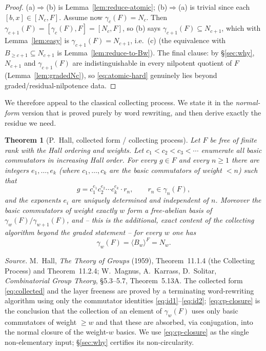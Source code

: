 \documentclass{amsart}
\newtheorem{theorem}{Theorem}
\theoremstyle{definition}
\theoremstyle{remark}
\begin{document}
\begin{proof}
(a)$\Rightarrow$(b) is Lemma~\ref{lem:reduce-atomic}; (b)$\Rightarrow$(a) is
trivial since each $[b,x]\in[N_c,F]$. Assume now $\gamma_c(F)=N_c$. Then
$\gamma_{c+1}(F)=[\gamma_c(F),F]=[N_c,F]$, so (b) says
$\gamma_{c+1}(F)\subseteq N_{c+1}$, which with Lemma~\ref{lem:easy} is
$\gamma_{c+1}(F)=N_{c+1}$, i.e.\ (c) (the equivalence with $B_{\ge c+1}\subseteq
N_{c+1}$ is Lemma~\ref{lem:reduce-to-Bw}). The final clause: by
\S\ref{sec:why}, $N_{c+1}$ and $\gamma_{c+1}(F)$ are indistinguishable in every
nilpotent quotient of $F$ (Lemma~\ref{lem:gradedNc}), so \eqref{eq:atomic-hard}
genuinely lies beyond graded/residual-nilpotence data.
\end{proof}

We therefore appeal to the classical collecting process. We state it in the
\emph{normal-form} version that is proved purely by word rewriting, and then derive
exactly the residue we need.

\begin{theorem}[P.~Hall, collected form / collecting process]\label{thm:cp}
Let $F$ be free of finite rank with the Hall ordering and weights. Let
$c_1<c_2<c_3<\cdots$ enumerate \emph{all} basic commutators in increasing Hall
order. For every $g\in F$ and every $n\ge1$ there are integers $e_1,\dots,e_{k}$
(where $c_1,\dots,c_k$ are the basic commutators of weight $<n$) such that
\begin{equation}\label{eq:collected}
g=c_1^{e_1}c_2^{e_2}\cdots c_k^{e_k}\cdot r_n,\qquad r_n\in\gamma_n(F),
\end{equation}
and the exponents $e_i$ are uniquely determined and independent of $n$. Moreover
the basic commutators of weight exactly $w$ form a free-abelian basis of
$\gamma_w(F)/\gamma_{w+1}(F)$, and -- this is the additional, exact content of the
collecting algorithm beyond the graded statement -- for every $w$ one has
\begin{equation}\label{eq:cp-closure}
\gamma_w(F)=\langle B_w\rangle^{F}=N_w .
\end{equation}
\end{theorem}

\noindent\emph{Source.} M.~Hall, \emph{The Theory of Groups} (1959),
Theorem~11.1.4 (the Collecting Process) and Theorem~11.2.4; W.~Magnus, A.~Karrass,
D.~Solitar, \emph{Combinatorial Group Theory}, \S5.3--5.7, Theorem~5.13A. The
collected form \eqref{eq:collected} and the layer freeness are proved by a
terminating word-rewriting algorithm using only the commutator identities
\eqref{eq:id1}--\eqref{eq:id2}; \eqref{eq:cp-closure} is the conclusion that the
collection of an element of $\gamma_w(F)$ uses only basic commutators of weight
$\ge w$ and that these are absorbed, via conjugation, into the normal closure of
the weight-$w$ basics. We use \eqref{eq:cp-closure} as the single non-elementary
input; \S\ref{sec:why} certifies its non-circularity.
\end{document}
